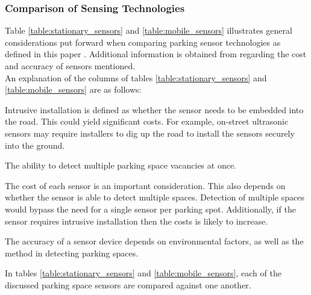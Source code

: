 \subsubsection*{Comparison of Sensing Technologies}
Table \ref{table:stationary_sensors} and \ref{table:mobile_sensors} illustrates general considerations put forward when comparing parking sensor technologies as defined in this paper \citep{Lin2008SecurityNetworks}. Additional information is obtained from \citep{dokur_embedded_2016} regarding the cost and accuracy of sensors mentioned. \\

\noindent An explanation of the columns of tables \ref{table:stationary_sensors} and \ref{table:mobile_sensors} are as follows:
\begin{description}[leftmargin=14em, style=nextline]
    \item[Intrusive Installation (IV)] Intrusive installation is defined as whether the sensor needs to be embedded into the road. This could yield significant costs. For example, on-street ultrasonic sensors may require installers to dig up the road to install the sensors securely into the ground.
    \item[Multiple Detection (MD)] The ability to detect multiple parking space vacancies at once.
    \item[Cost (C)] The cost of each sensor is an important consideration. This also depends on whether the sensor is able to detect multiple spaces. Detection of multiple spaces would bypass the need for a single sensor per parking spot. Additionally, if the sensor requires intrusive installation then the costs is likely to increase.
    \item[Accuracy (A)] The accuracy of a sensor device depends on environmental factors, as well as the method in detecting parking spaces.
\end{description}

In tables \ref{table:stationary_sensors} and \ref{table:mobile_sensors}, each of the discussed parking space sensors are compared against one another. 

